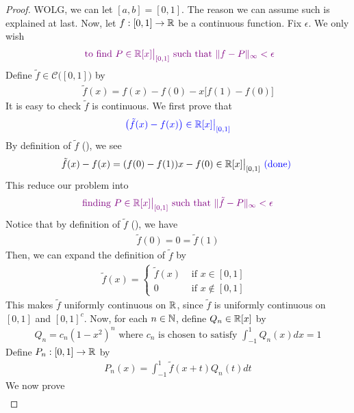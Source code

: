\documentclass{report}
\begin{document}
\begin{proof}
WOLG, we can let $[a,b]=[0,1]$. The reason we can assume such is explained at last. Now, let $f:[0,1]\rightarrow \mathbb{R}$ be a continuous function. Fix $\epsilon $. We only wish 
\begin{align*}
\textcolor{violet}{\text{ to find $P \in \mathbb{R}[x]\big|_{[0,1]}$ such that $\| f-P \|_{\infty}<\epsilon $}}
\end{align*}
Define $\tilde{f} \in \mathcal{C}\big([0,1] \big)$ by 
\begin{align}
  \label{tse1}
\tilde{f}(x)= f(x)-f(0)-x \big[f(1)-f(0) \big] 
\end{align}
It is easy to check $\tilde{f}$ is continuous. We first prove that 
\begin{align*}
\textcolor{blue}{\big( \tilde{f}(x)-f(x)\big)\in \mathbb{R}[x]\big|_{[0,1]}  }
\end{align*}
By definition of $\tilde{f} $ (), we see 
\begin{align*}
\tilde{f}(x)-f(x)=(f(0)-f(1))x- f(0)\in \mathbb{R}[x]\big|_{[0,1]}\textcolor{blue}{\text{ (done) }}
\end{align*}
This reduce our problem into 
\begin{align*}
\textcolor{violet}{\text{ finding }P\in \mathbb{R}[x]\big|_{[0,1]}\text{ such that $\| \tilde{f}-P \|_{\infty}<\epsilon $ }}
\end{align*}
Notice that by definition of $\tilde{f}$ (), we have 
\begin{align*}
\tilde{f}(0)=0=\tilde{f}(1) 
\end{align*}
Then, we can expand the definition of $\tilde{f} $  by
\begin{align}
\label{tse2}  
\tilde{f}(x)=\begin{cases}
  \tilde{f} (x)& \text{ if $x\in [0,1]$ }\\
  0& \text{ if $x \not \in [0,1]$ }
\end{cases}
\end{align}
This makes $\tilde{f}$ uniformly continuous on $\mathbb{R}$, since  $\tilde{f}$ is uniformly continuous on $[0,1]$ and $[0,1]^c$. Now, for each $n\in\mathbb{N}$, define $Q_n \in \mathbb{R}[x]$ by 
\begin{align}
\label{tse3}
Q_n=c_n(1-x^2)^n\text{ where $c_n$ is chosen to satisfy }\int_{-1}^1 Q_n(x)dx=1
\end{align}
Define $P_n:[0,1]\rightarrow \mathbb{R}$ by 
\begin{align*}
P_n(x)=\int_{-1}^1 \tilde{f} (x+t)Q_n(t)dt
\end{align*}
We now prove 
\begin{align*}

\end{align*}
\end{proof}
\end{document}
